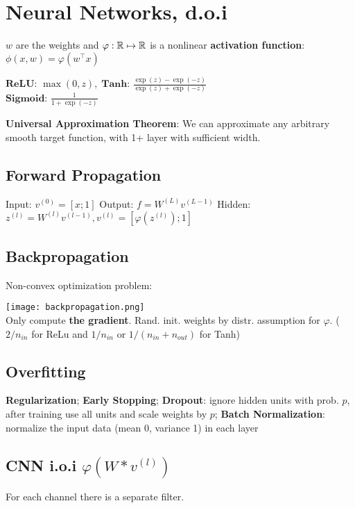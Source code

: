 \section*{Neural Networks, d.o.i}
$w$ are the weights and $\varphi: \mathbb{R} \mapsto \mathbb{R}$ is a nonlinear \textbf{activation function}: $\phi(x, w) = \varphi(w^\top x)$


$\textbf{ReLU: } \max (0,z), \; \textbf{Tanh: } \frac{\exp(z) - \exp(-z)}{\exp(z) + \exp(-z)}$ \\[-3pt]
$\textbf{Sigmoid: } \frac{1}{1 + \exp(-z)}$


\textbf{Universal Approximation Theorem}: We can approximate any arbitrary smooth target function, with 1+ layer with sufficient width.

\subsection*{Forward Propagation}

Input: $v^{(0)} = [x; 1]$ \quad Output: $f = W^{(L)} v^{(L-1)}$
Hidden: $z^{(l)} = W^{(l)} v^{(l-1)}, v^{(l)} = [\varphi(z^{(l)}); 1]$


\subsection*{Backpropagation}

Non-convex optimization problem: 

\texttt{[image: backpropagation.png]} \\[-10pt]

Only compute \color{Red} \textbf{the gradient}\color{Black}. Rand. init. weights by distr. assumption for $\varphi$. ( $2 / n_{in}$ for ReLu and $1/n_{in}$ or $ 1/ (n_{in} + n_{out})$ for Tanh)

\subsection*{Overfitting}
\textbf{Regularization}; \textbf{Early Stopping}; \textbf{Dropout}: ignore hidden units with prob. $p$, after training use all units and scale weights by $p$; \textbf{Batch Normalization}: normalize the input data (mean 0, variance 1) in each layer

\subsection*{CNN \quad i.o.i \color{Black}$\varphi(W * v^{(l)})$ }
For each channel there is a separate filter.

